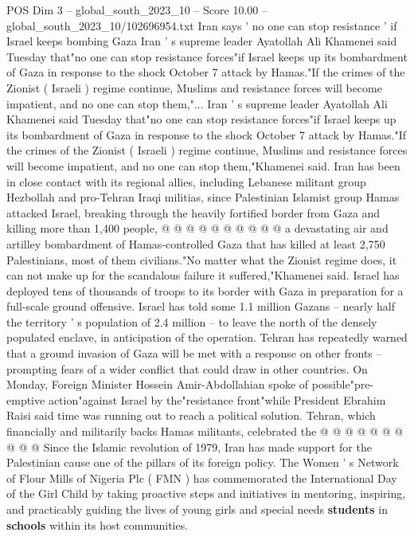 \begin{textsample}{POS Dim 3 – global\_south\_2023\_10 – Score 10.00 – global\_south\_2023\_10/102696954.txt}  \label{ex:f3_pos_430}
Iran says ' no one can stop resistance ' if Israel keeps bombing Gaza Iran ' s supreme leader Ayatollah Ali Khamenei said Tuesday that"no one can stop resistance forces"if Israel keeps up its bombardment of Gaza in response to the shock October 7 attack by Hamas."If the crimes of the Zionist ( Israeli ) regime continue, Muslims and resistance forces will become impatient, and no one can stop them,"...
Iran ' s supreme leader Ayatollah Ali Khamenei said Tuesday that"no one can stop resistance forces"if Israel keeps up its bombardment of Gaza in response to the shock October 7 attack by Hamas."If the crimes of the Zionist ( Israeli ) regime continue, Muslims and resistance forces will become impatient, and no one can stop them,"Khamenei said.
Iran has been in close contact with its regional allies, including Lebanese militant group Hezbollah and pro-Tehran Iraqi militias, since Palestinian Islamist group Hamas attacked Israel, breaking through the heavily fortified border from Gaza and killing more than 1,400 people, @ @ @ @ @ @ @ @ @ @ a devastating air and artilley bombardment of Hamas-controlled Gaza that has killed at least 2,750 Palestinians, most of them civilians."No matter what the Zionist regime does, it can not make up for the scandalous failure it suffered,"Khamenei said.
Israel has deployed tens of thousands of troops to its border with Gaza in preparation for a full-scale ground offensive.
Israel has told some 1.1 million Gazans -- nearly half the territory ' s population of 2.4 million -- to leave the north of the densely populated enclave, in anticipation of the operation.
Tehran has repeatedly warned that a ground invasion of Gaza will be met with a response on other fronts -- prompting fears of a wider conflict that could draw in other countries.
On Monday, Foreign Minister Hossein Amir-Abdollahian spoke of possible"pre-emptive action"against Israel by the"resistance front"while President Ebrahim Raisi said time was running out to reach a political solution.
Tehran, which financially and militarily backs Hamas militants, celebrated the @ @ @ @ @ @ @ @ @ @ Since the Islamic revolution of 1979, Iran has made support for the Palestinian cause one of the pillars of its foreign policy.
The Women ' s Network of Flour Mills of Nigeria Plc ( FMN ) has commemorated the International Day of the Girl Child by taking proactive steps and initiatives in mentoring, inspiring, and practicably guiding the lives of young girls and special needs \textbf{students} in \textbf{schools} within its host communities.

\end{textsample}
